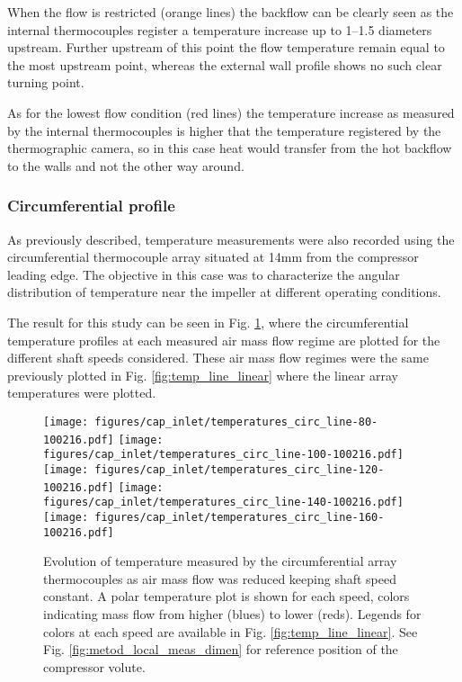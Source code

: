 When the flow is restricted (orange lines) the backflow can be clearly seen as the internal thermocouples register a temperature increase up to 1--1.5 diameters upstream. Further upstream of this point the flow temperature remain equal to the most upstream point, whereas the external wall profile shows no such clear turning point.

As for the lowest flow condition (red lines) the temperature increase as measured by the internal thermocouples is higher that the temperature registered by the thermographic camera, so in this case heat would transfer from the hot backflow to the walls and not the other way around.

\subsubsection{Circumferential profile}

As previously described, temperature measurements were also recorded using the circumferential thermocouple array situated at 14mm from the compressor leading edge. The objective in this case was to characterize the angular distribution of temperature near the impeller at different operating conditions.

The result for this study can be seen in Fig. \ref{fig:temp_circ_all}, where the circumferential temperature profiles at each measured air mass flow regime are plotted for the different shaft speeds considered. These air mass flow regimes were the same previously plotted in Fig. \ref{fig:temp_line_linear} where the linear array temperatures were plotted.

\begin{figure}[t!]
\centering
\texttt{[image: figures/cap\_inlet/temperatures\_circ\_line-80-100216.pdf]}
\texttt{[image: figures/cap\_inlet/temperatures\_circ\_line-100-100216.pdf]}
\texttt{[image: figures/cap\_inlet/temperatures\_circ\_line-120-100216.pdf]}
\texttt{[image: figures/cap\_inlet/temperatures\_circ\_line-140-100216.pdf]}
\texttt{[image: figures/cap\_inlet/temperatures\_circ\_line-160-100216.pdf]}
\caption{Evolution of temperature measured by the circumferential array thermocouples as air mass flow was reduced keeping shaft speed constant. A polar temperature plot is shown for each speed, colors indicating mass flow from higher (blues) to lower (reds). Legends for colors at each speed are available in Fig. \ref{fig:temp_line_linear}. See Fig. \ref{fig:metod_local_meas_dimen} for reference position of the compressor volute.}
\label{fig:temp_circ_all}
\end{figure}

